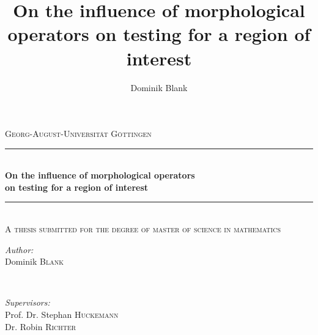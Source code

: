 \documentclass[a4paper,12pt]{article}
\author{Dominik Blank}
\title{On the influence of morphological operators on testing for a region of interest}
\theoremstyle{plain}
\theoremstyle{definition}
\theoremstyle{remark}
\begin{document}
\begin{titlepage}

\newcommand{\HRule}{\rule{\linewidth}{0.5mm}} %

\center %
 

\textsc{\Large Georg-August-Universität Göttingen}\\[1.5cm] %


\HRule \\[0.4cm]
{\large \bfseries On the influence of morphological operators\\ on testing for a region of interest}\\[0.2cm] %
\HRule \\[1cm]
\textsc{\large A thesis submitted for the degree of master of science in mathematics}\\[2cm] %


\begin{minipage}[t]{0.3\textwidth}
\begin{flushleft} \large
\emph{Author:}\\
Dominik \textsc{Blank}
\end{flushleft}
\end{minipage}
~
\begin{minipage}[t]{0.6\textwidth}
\begin{flushright} \large
\emph{Supervisors:} \\
Prof. Dr. Stephan \textsc{Huckemann}\\
Dr. Robin \textsc{Richter}
\end{flushright}
\end{minipage}\\[4cm]


\end{titlepage}
\end{document}
